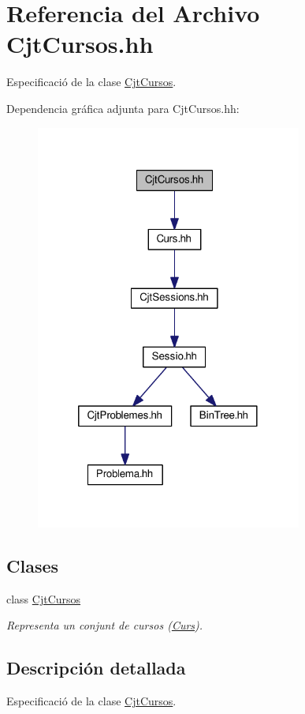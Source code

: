 \hypertarget{_cjt_cursos_8hh}{}\section{Referencia del Archivo Cjt\+Cursos.\+hh}
\label{_cjt_cursos_8hh}


Especificació de la clase \mbox{\hyperlink{class_cjt_cursos}{Cjt\+Cursos}}.  


Dependencia gráfica adjunta para Cjt\+Cursos.\+hh\+:\nopagebreak
\begin{figure}[H]
\begin{center}
\leavevmode
\includegraphics[width=248pt]{_cjt_cursos_8hh__incl}
\end{center}
\end{figure}
\subsection*{Clases}
\begin{DoxyCompactItemize}
\item 
class \mbox{\hyperlink{class_cjt_cursos}{Cjt\+Cursos}}
\begin{DoxyCompactList}\small\item\em Representa un conjunt de cursos (\mbox{\hyperlink{class_curs}{Curs}}). \end{DoxyCompactList}\end{DoxyCompactItemize}


\subsection{Descripción detallada}
Especificació de la clase \mbox{\hyperlink{class_cjt_cursos}{Cjt\+Cursos}}. 


